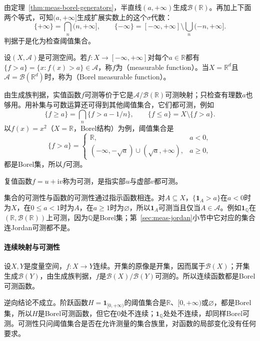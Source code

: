 由定理~\ref{thm:meas-borel-generators}，半直线$(a,+\infty)$生成$\mathcal B(\mathbb R)$。再加上下面两个等式，可知$(a,+\infty]$生成扩展实数上的这个$\sigma$代数：
\[
 \{+\infty\}=\bigcap_n(n,+\infty],\qquad
 \{-\infty\}=[-\infty,+\infty]\setminus\bigcup_n(-n,+\infty].
\]
判据于是化为检查阈值集合。

\begin{definition}[可测函数]
\label{def:meas-measurable-function}
设$(X,\mathcal A)$是可测空间。若$f:X\to[-\infty,+\infty]$对每个$a\in\mathbb R$都有$\{f>a\}=\{x:f(x)>a\}\in\mathcal A$，称$f$为（measurable function）。当$X=\mathbb R^d$且$\mathcal A=\mathcal B(\mathbb R^d)$时，称为（Borel measurable function）。
\end{definition}

由生成族判据，实值函数$f$可测等价于它是$\mathcal A/\mathcal B(\mathbb R)$可测映射；只检查有理数$a$也够用。用补集与可数运算还可得到其他阈值集合，它们都可测，例如
\[
 \{f\geq a\}=\bigcap_n\{f>a-1/n\},\qquad\{f\leq a\}=X\setminus\{f>a\}.
\]
以$f(x)=x^2$（$X=\mathbb R$，Borel结构）为例，阈值集合是
\[
 \{f>a\}=\begin{cases}\mathbb R,&a<0,\\(-\infty,-\sqrt a)\cup(\sqrt a,+\infty),&a\geq0,\end{cases}
\]
都是Borel集，所以$f$可测。

复值函数$f=u+\mathrm iv$称为可测，是指实部$u$与虚部$v$都可测。

集合的可测性与函数的可测性通过指示函数相连。对$A\subseteq X$，$\{\mathbf 1_A>a\}$在$a<0$时为$X$，在$0\leq a<1$时为$A$，在$a\geq1$时为$\varnothing$，所以$\mathbf 1_A$可测当且仅当$A\in\mathcal A$。例如$\mathbf 1_{\mathbb Q}$在$(\mathbb R,\mathcal B(\mathbb R))$上可测，因为$\mathbb Q$是Borel集；第~\ref{sec:meas-jordan}小节中它对应的集合连Jordan可测都不是。

\paragraph{连续映射与可测性}
设$X,Y$是度量空间，$f:X\to Y$连续。开集的原像是开集，因而属于$\mathcal B(X)$；开集生成$\mathcal B(Y)$，由生成族判据，$f$是$\mathcal B(X)/\mathcal B(Y)$可测的。所以连续函数都是Borel可测函数。

逆向结论不成立。阶跃函数$H=\mathbf 1_{[0,+\infty)}$的阈值集合是$\mathbb R$、$[0,+\infty)$或$\varnothing$，都是Borel集，所以$H$是Borel可测函数，但它在$0$处不连续；$\mathbf 1_{\mathbb Q}$处处不连续，却同样Borel可测。可测性只问阈值集合是否在允许测量的集合族里，对函数的局部变化没有任何要求。

